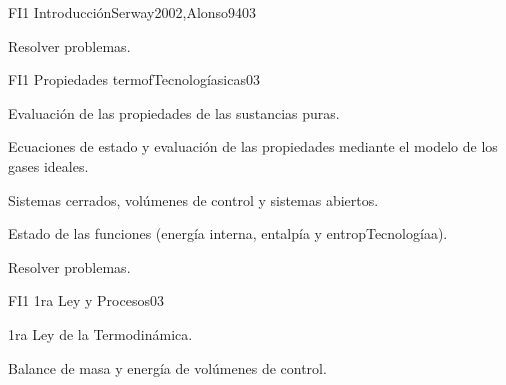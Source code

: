 \begin{syllabus}
\begin{unit}{FI1 Introducción}{Serway2002,Alonso94}{0}{3}
\begin{topics}

   \end{topics}

   \begin{learningoutcomes}
      \item Resolver problemas.
   \end{learningoutcomes}
\end{unit}

\begin{unit}{FI1 Propiedades termofTecnologíasicas}{}{0}{3}
\begin{topics}
      \item Evaluación de las propiedades de las sustancias puras.
      \item Ecuaciones de estado y evaluación de las propiedades mediante el modelo de los gases ideales.
      \item Sistemas cerrados, volúmenes de control y sistemas abiertos.
      \item Estado de las funciones (energía interna, entalpía y entropTecnologíaa).
  
  
  
  
   \end{topics}

   \begin{learningoutcomes}
      \item Resolver problemas.
   \end{learningoutcomes}
\end{unit}

\begin{unit}{FI1 1ra Ley y Procesos}{}{0}{3}
\begin{topics}
      \item 1ra Ley de la Termodinámica.
      \item Balance de masa y energía de volúmenes de control.
      
      
      
   \end{topics}


\end{unit}
\end{syllabus}
